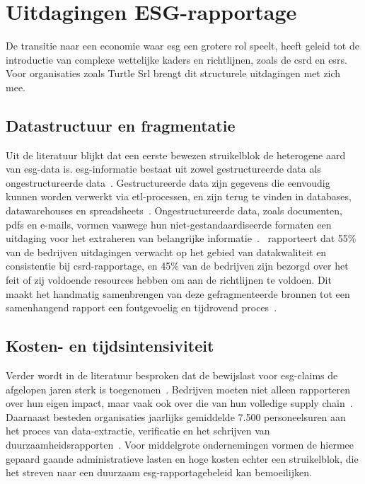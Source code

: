 \section{Uitdagingen ESG-rapportage}

De transitie naar een economie waar \gls{esg} een grotere rol speelt, heeft geleid tot de introductie van complexe wettelijke kaders en richtlijnen, zoals de \gls{csrd} en \gls{esrs}. Voor organisaties zoals Turtle Srl brengt dit structurele uitdagingen met zich mee.

\subsection{Datastructuur en fragmentatie}

Uit de literatuur blijkt dat een eerste bewezen struikelblok de heterogene aard van \gls{esg}-data is. \gls{esg}-informatie bestaat uit zowel gestructureerde data als ongestructureerde data~\autocite{Lavin2021}. Gestructureerde data zijn gegevens die eenvoudig kunnen worden verwerkt via \gls{etl}-processen, en zijn terug te vinden in databases, datawarehouses en spreadsheets~\autocite{Peng2024}. Ongestructureerde data, zoals documenten, \glspl{pdf} en e-mails, vormen vanwege hun niet-gestandaardiseerde formaten een uitdaging voor het extraheren van belangrijke informatie~\autocite{Peng2024,Morales2022}.~\textcite{FundsEurope2025} rapporteert dat 55\% van de bedrijven uitdagingen verwacht op het gebied van datakwaliteit en consistentie bij \gls{csrd}-rapportage, en 45\% van de bedrijven zijn bezorgd over het feit of zij voldoende resources hebben om aan de richtlijnen te voldoen. Dit maakt het handmatig samenbrengen van deze gefragmenteerde bronnen tot een samenhangend rapport een foutgevoelig en tijdrovend proces~\autocite{Gharpure2025}.

\subsection{Kosten- en tijdsintensiviteit}

Verder wordt in de literatuur besproken dat de bewijslast voor \gls{esg}-claims de afgelopen jaren sterk is toegenomen~\autocite{Centre.2023,Lew2024}. Bedrijven moeten niet alleen rapporteren over hun eigen impact, maar vaak ook over die van hun volledige supply chain~\autocite{Fornasari2024,Gharpure2025}. Daarnaast besteden organisaties jaarlijks gemiddelde 7.500 personeelsuren aan het proces van data-extractie, verificatie en het schrijven van duurzaamheidsrapporten~\autocite{Gharpure2025}. Voor middelgrote ondernemingen vormen de hiermee gepaard gaande administratieve lasten en hoge kosten echter een struikelblok, die het streven naar een duurzaam \gls{esg}-rapportagebeleid kan bemoeilijken.

